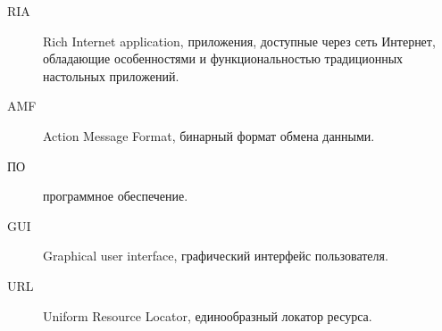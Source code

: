 \Abbreviations %
\begin{description}
\item[RIA] Rich Internet application, приложения, доступные через сеть Интернет, обладающие особенностями и
функциональностью традиционных настольных приложений.
\item[AMF] Action Message Format, бинарный формат обмена данными.
\item[ПО] программное обеспечение.
\item[GUI] Graphical user interface, графический интерфейс пользователя.
\item[URL] Uniform Resource Locator, единообразный локатор ресурса.
\end{description}
